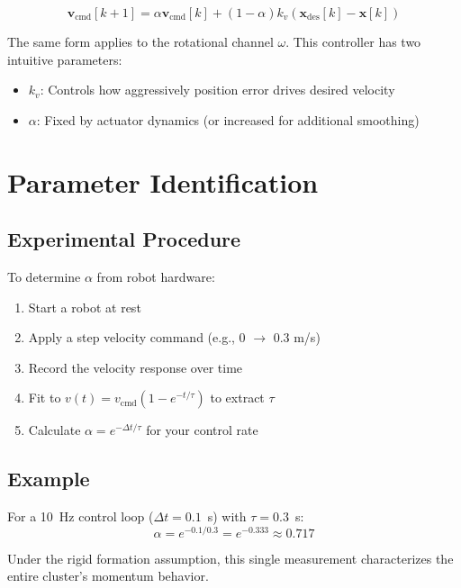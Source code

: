 \documentclass[11pt]{article}
\begin{document}
\begin{equation}
\boxed{\mathbf{v}_{\text{cmd}}[k+1] = \alpha \mathbf{v}_{\text{cmd}}[k] + (1-\alpha)k_v(\mathbf{x}_{\text{des}}[k] - \mathbf{x}[k])}
\label{eq:final}
\end{equation}

The same form applies to the rotational channel $\omega$. This controller has two intuitive parameters:
\begin{itemize}
    \item $k_v$: Controls how aggressively position error drives desired velocity
    \item $\alpha$: Fixed by actuator dynamics (or increased for additional smoothing)
\end{itemize}

\section{Parameter Identification}

\subsection{Experimental Procedure}
To determine $\alpha$ from robot hardware:
\begin{enumerate}
    \item Start a robot at rest
    \item Apply a step velocity command (e.g., 0 $\to$ 0.3 m/s)
    \item Record the velocity response over time
    \item Fit to $v(t) = v_{\text{cmd}}(1 - e^{-t/\tau})$ to extract $\tau$
    \item Calculate $\alpha = e^{-\Delta t/\tau}$ for your control rate
\end{enumerate}

\subsection{Example}
For a 10~Hz control loop ($\Delta t = 0.1$~s) with $\tau = 0.3$~s:
\begin{equation}
\alpha = e^{-0.1/0.3} = e^{-0.333} \approx 0.717
\end{equation}

Under the rigid formation assumption, this single measurement characterizes the entire cluster's momentum behavior.
\end{document}
